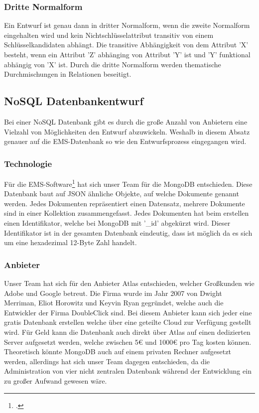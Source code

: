 			\subsubsection{Dritte Normalform}
				Ein Entwurf ist genau dann in dritter Normalform, wenn die zweite Normalform eingehalten wird und kein Nichtschlüsselattribut transitiv von einem Schlüsselkandidaten abhängt. 
				Die transitive Abhängigkeit von dem Attribut 'X' besteht, wenn ein Attribut 'Z' abhänging von Attribut 'Y' ist und 'Y' funktional abhängig von 'X' ist. 
				Durch die dritte Normalform werden thematische Durchmischungen in Relationen beseitigt. 		
		\subsection{NoSQL Datenbankentwurf}
			Bei einer NoSQL Datenbank gibt es durch die große Anzahl von Anbietern eine Vielzahl von Möglichkeiten den Entwurf abzuwickeln. 
			Weshalb in diesem Absatz genauer auf die EMS-Datenbank so wie den Entwurfsprozess eingegangen wird. 
			\subsubsection{Technologie}
				Für die EMS-Software\footcite{mongohistory} hat sich unser Team für die MongoDB entschieden. Diese Datenbank baut auf JSON ähnliche Objekte, auf welche Dokumente genannt werden. 
				Jedes Dokumenten repräsentiert einen Datensatz, mehrere Dokumente sind in einer Kollektion zusammengefasst. 
				Jedes Dokumenten hat beim erstellen einen Identifikator, welche bei MongoDB mit '\_id' abgekürzt wird. 
				Dieser Identifikator ist in der gesamten Datenbank eindeutig, dass ist möglich da es sich um eine hexadezimal 12-Byte Zahl handelt. 
			\subsubsection{Anbieter}
				Unser Team hat sich für den Anbieter Atlas entschieden, welcher Großkunden wie Adobe und Google betreut. 
				Die Firma wurde im Jahr 2007 von Dwight Merriman, Eliot Horowitz und Keyvin Ryan gegründet, welche auch die Entwickler der Firma DoubleClick sind. 
				Bei diesem Anbieter kann sich jeder eine gratis Datenbank erstellen welche über eine geteilte Cloud zur Verfügung gestellt wird. 
				Für Geld kann die Datenbank auch direkt über Atlas auf einen dedizierten Server aufgesetzt werden, welche zwischen 5€ und 1000€ pro Tag kosten können. 
				Theoretisch könnte MongoDB auch auf einem privaten Rechner aufgesetzt werden, allerdings hat sich unser Team dagegen entschieden, da die Administration von vier nicht zentralen Datenbank während der Entwicklung ein zu großer Aufwand gewesen wäre.
